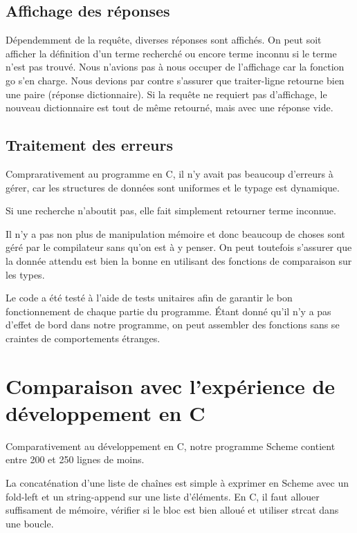 \documentclass{article}
\begin{document}
  \subsection{Affichage des réponses}
  Dépendemment de la requête, diverses réponses sont affichés. On peut soit
  afficher la définition d'un terme recherché ou encore terme inconnu si le
  terme n'est pas trouvé. Nous n'avions pas à nous occuper de l'affichage car la
  fonction go s'en charge. Nous devions par contre s'assurer que traiter-ligne
  retourne bien une paire (réponse dictionnaire). Si la requête ne requiert pas
  d'affichage, le nouveau dictionnaire est tout de même retourné, mais avec une
  réponse vide.

  \subsection{Traitement des erreurs}
  Comprarativement au programme en C, il n'y avait pas beaucoup d'erreurs à
  gérer, car les structures de données sont uniformes et le typage est
  dynamique.

  Si une recherche n'aboutit pas, elle fait simplement retourner terme inconnue.

  Il n'y a pas non plus de manipulation mémoire et donc beaucoup de choses sont
  géré par le compilateur sans qu'on est à y penser. On peut toutefois s'assurer
  que la donnée attendu est bien la bonne en utilisant des fonctions de
  comparaison sur les types.

  Le code a été testé à l'aide de tests unitaires afin de garantir le bon
  fonctionnement de chaque partie du programme. Étant donné qu'il n'y a pas
  d'effet de bord dans notre programme, on peut assembler des fonctions sans se
  craintes de comportements étranges.

  \section{Comparaison avec l'expérience de développement en C}

  Comparativement au développement en C, notre programme Scheme contient entre
  200 et 250 lignes de moins.

  La concaténation d'une liste de chaînes est simple à exprimer en Scheme avec
  un \textsf{fold-left} et un \textsf{string-append} sur une liste d'éléments.
  En C, il faut allouer suffisament de mémoire, vérifier si le bloc est bien
  alloué et utiliser \textsf{strcat} dans une boucle.
\end{document}
